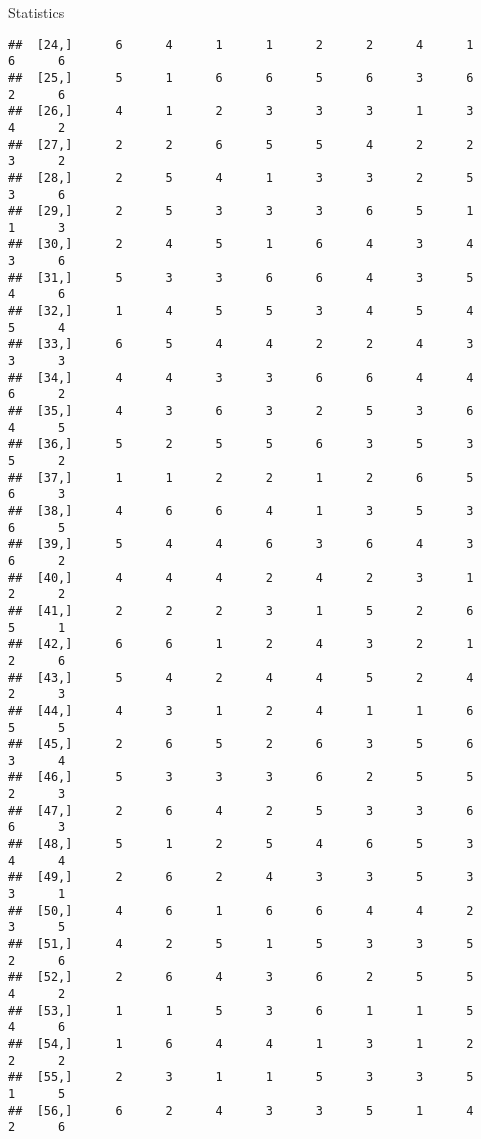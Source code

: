 \documentclass[
  ignorenonframetext,
]{beamer}
\begin{document}
\begin{frame}[fragile]{Statistics}
\begin{verbatim}
##  [24,]      6      4      1      1      2      2      4      1      6      6
##  [25,]      5      1      6      6      5      6      3      6      2      6
##  [26,]      4      1      2      3      3      3      1      3      4      2
##  [27,]      2      2      6      5      5      4      2      2      3      2
##  [28,]      2      5      4      1      3      3      2      5      3      6
##  [29,]      2      5      3      3      3      6      5      1      1      3
##  [30,]      2      4      5      1      6      4      3      4      3      6
##  [31,]      5      3      3      6      6      4      3      5      4      6
##  [32,]      1      4      5      5      3      4      5      4      5      4
##  [33,]      6      5      4      4      2      2      4      3      3      3
##  [34,]      4      4      3      3      6      6      4      4      6      2
##  [35,]      4      3      6      3      2      5      3      6      4      5
##  [36,]      5      2      5      5      6      3      5      3      5      2
##  [37,]      1      1      2      2      1      2      6      5      6      3
##  [38,]      4      6      6      4      1      3      5      3      6      5
##  [39,]      5      4      4      6      3      6      4      3      6      2
##  [40,]      4      4      4      2      4      2      3      1      2      2
##  [41,]      2      2      2      3      1      5      2      6      5      1
##  [42,]      6      6      1      2      4      3      2      1      2      6
##  [43,]      5      4      2      4      4      5      2      4      2      3
##  [44,]      4      3      1      2      4      1      1      6      5      5
##  [45,]      2      6      5      2      6      3      5      6      3      4
##  [46,]      5      3      3      3      6      2      5      5      2      3
##  [47,]      2      6      4      2      5      3      3      6      6      3
##  [48,]      5      1      2      5      4      6      5      3      4      4
##  [49,]      2      6      2      4      3      3      5      3      3      1
##  [50,]      4      6      1      6      6      4      4      2      3      5
##  [51,]      4      2      5      1      5      3      3      5      2      6
##  [52,]      2      6      4      3      6      2      5      5      4      2
##  [53,]      1      1      5      3      6      1      1      5      4      6
##  [54,]      1      6      4      4      1      3      1      2      2      2
##  [55,]      2      3      1      1      5      3      3      5      1      5
##  [56,]      6      2      4      3      3      5      1      4      2      6

\end{verbatim}
\end{frame}
\end{document}
